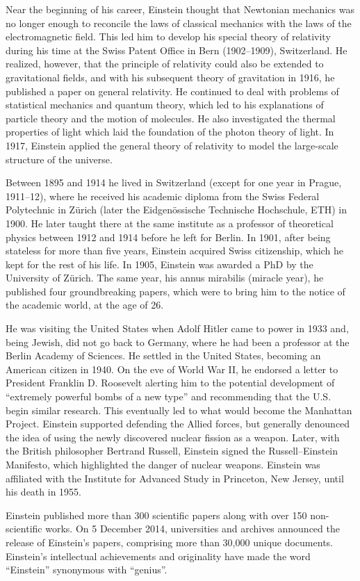 Near the beginning of his career, Einstein thought that Newtonian mechanics was no longer enough to reconcile the laws of classical mechanics with the laws of the electromagnetic field. This led him to develop his special theory of relativity during his time at the Swiss Patent Office in Bern (1902–1909), Switzerland. He realized, however, that the principle of relativity could also be extended to gravitational fields, and with his subsequent theory of gravitation in 1916, he published a paper on general relativity. He continued to deal with problems of statistical mechanics and quantum theory, which led to his explanations of particle theory and the motion of molecules. He also investigated the thermal properties of light which laid the foundation of the photon theory of light. In 1917, Einstein applied the general theory of relativity to model the large-scale structure of the universe.

Between 1895 and 1914 he lived in Switzerland (except for one year in Prague, 1911–12), where he received his academic diploma from the Swiss Federal Polytechnic in Zürich (later the Eidgenössische Technische Hochschule, ETH) in 1900. He later taught there at the same institute as a professor of theoretical physics between 1912 and 1914 before he left for Berlin. In 1901, after being stateless for more than five years, Einstein acquired Swiss citizenship, which he kept for the rest of his life. In 1905, Einstein was awarded a PhD by the University of Zürich. The same year, his annus mirabilis (miracle year), he published four groundbreaking papers, which were to bring him to the notice of the academic world, at the age of 26.

He was visiting the United States when Adolf Hitler came to power in 1933 and, being Jewish, did not go back to Germany, where he had been a professor at the Berlin Academy of Sciences. He settled in the United States, becoming an American citizen in 1940. On the eve of World War II, he endorsed a letter to President Franklin D. Roosevelt alerting him to the potential development of ``extremely powerful bombs of a new type'' and recommending that the U.S. begin similar research. This eventually led to what would become the Manhattan Project. Einstein supported defending the Allied forces, but generally denounced the idea of using the newly discovered nuclear fission as a weapon. Later, with the British philosopher Bertrand Russell, Einstein signed the Russell–Einstein Manifesto, which highlighted the danger of nuclear weapons. Einstein was affiliated with the Institute for Advanced Study in Princeton, New Jersey, until his death in 1955.

Einstein published more than 300 scientific papers along with over 150 non-scientific works. On 5 December 2014, universities and archives announced the release of Einstein's papers, comprising more than 30,000 unique documents. Einstein's intellectual achievements and originality have made the word ``Einstein'' synonymous with ``genius''.
